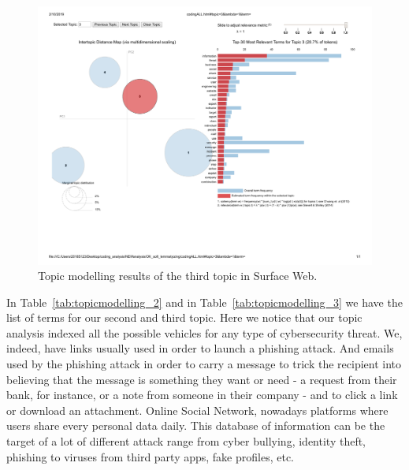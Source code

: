 
\begin{figure}[h!]
\begin{center}
\includegraphics[scale=0.5]{./img/codingALL_topic3.pdf}
\end{center}
\caption{Topic modelling results of the third topic in Surface Web.}
\label{fig:topicmodelling_3}
\end{figure}

In Table~\ref{tab:topicmodelling_2} and in Table~\ref{tab:topicmodelling_3} we have the list of terms for our second and third topic. Here we notice that our topic analysis indexed all the possible vehicles for any type of cybersecurity threat. We, indeed, have links usually used in order to launch a phishing attack. And emails used by the phishing attack in order to carry a message to trick the recipient into believing that the message is something they want or need - a request from their bank, for instance, or a note from someone in their company - and to click a link or download an attachment. Online Social Network, nowadays platforms where users share every personal data daily. This database of information can be the target of a lot of different attack range from cyber bullying, identity theft, phishing to viruses from third party apps, fake profiles, etc.  



